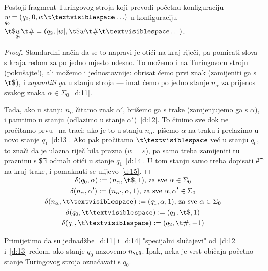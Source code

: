 \begin{lema}[{name=[prvi fragment transpiliranog stroja]}]\label{lm:faza1}
Postoji fragment Turingovog stroja koji prevodi početnu konfiguraciju $\underset{q_0}{w}=(q_0,0,w\bl\ldots)$ u konfiguraciju $\t\$\underset{q_2}{w}\t\#=(q_2,\dulj{w},\t\$w\t\#\bl\ldots)$.
\end{lema}
\begin{proof}
Standardni način da se to napravi je otići na kraj riječi, pa pomicati slova s kraja redom za po jedno mjesto udesno. To možemo i na Turingovom stroju (pokušajte!), ali možemo i jednostavnije: obrisat ćemo prvi znak (zamijeniti ga s $\t\$$), i \emph{zapamtiti ga} u stanju stroja --- imat ćemo po jedno stanje $n_\alpha$ za prijenos svakog znaka $\alpha\in\Sigma_0$~\eqref{d:11}.

Tada, ako u stanju $n_\alpha$ čitamo znak $\alpha'$, brišemo ga s trake (zamjenjujemo ga s $\alpha$), i pamtimo u stanju (odlazimo u stanje $\alpha'$)~\eqref{d:12}. To činimo sve dok ne pročitamo prvu \bl\ na traci: ako je to u stanju $n_\alpha$, pišemo $\alpha$ na traku i prelazimo u novo stanje $q_1$~\eqref{d:13}. Ako pak pročitamo $\bl$ već u stanju $q_0$, to znači da je ulazna riječ bila prazna ($w=\varepsilon$), pa samo treba zamijeniti tu prazninu s \t\$ i odmah otići u stanje $q_1$~\eqref{d:14}. U tom stanju samo treba dopisati \t\# na kraj trake, i pomaknuti se ulijevo~\eqref{d:15}.
\end{proof}
\noindent\begin{gather}
    \SwapAboveDisplaySkip
\label{d:11}
    \delta(q_0,\alpha):=(n_\alpha,\t\$,1)\text{, za sve }\alpha\in\Sigma_0\\
\label{d:12}
    \delta(n_\alpha,\alpha'):=(n_{\alpha'},\alpha,1)\text{, za sve }\alpha,\alpha'\in\Sigma_0\\
\label{d:13}
    \delta(n_\alpha,\bl):=(q_1,\alpha,1)\text{, za sve }\alpha\in\Sigma_0\\
\label{d:14}
    \delta(q_0,\bl):=(q_1,\t\$,1)\\
\label{d:15}
    \delta(q_1,\bl):=(q_2,\t\#,-1)
\end{gather}

Primijetimo da su jednadžbe~\eqref{d:11} i~\eqref{d:14} "specijalni slučajevi" od~\eqref{d:12} i~\eqref{d:13} redom, ako stanje $q_0$ nazovemo $n_{\t\$}$. Ipak, neka je vrst običaja početno stanje Turingovog stroja označavati s $q_0$.

